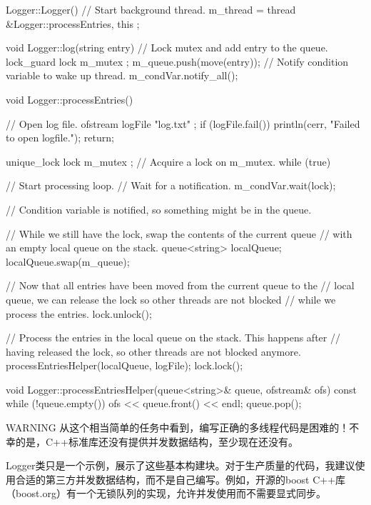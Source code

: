 \begin{cpp}
Logger::Logger()
{
    // Start background thread.
    m_thread = thread { &Logger::processEntries, this };
}

void Logger::log(string entry)
{
    // Lock mutex and add entry to the queue.
    lock_guard lock { m_mutex };
    m_queue.push(move(entry));
    // Notify condition variable to wake up thread.
    m_condVar.notify_all();
}

void Logger::processEntries()
{
    // Open log file.
    ofstream logFile { "log.txt" };
    if (logFile.fail()) {
        println(cerr, "Failed to open logfile.");
        return;
    }

    unique_lock lock { m_mutex }; // Acquire a lock on m_mutex.
    while (true) { // Start processing loop.
        // Wait for a notification.
        m_condVar.wait(lock);

        // Condition variable is notified, so something might be in the queue.

        // While we still have the lock, swap the contents of the current queue
        // with an empty local queue on the stack.
        queue<string> localQueue;
        localQueue.swap(m_queue);

        // Now that all entries have been moved from the current queue to the
        // local queue, we can release the lock so other threads are not blocked
        // while we process the entries.
        lock.unlock();

        // Process the entries in the local queue on the stack. This happens after
        // having released the lock, so other threads are not blocked anymore.
        processEntriesHelper(localQueue, logFile);
        lock.lock();
    }
}

void Logger::processEntriesHelper(queue<string>& queue, ofstream& ofs) const
{
    while (!queue.empty()) {
        ofs << queue.front() << endl;
        queue.pop();
    }
}
\end{cpp}

\begin{myWarning}{WARNING}
从这个相当简单的任务中看到，编写正确的多线程代码是困难的！不幸的是，C++标准库还没有提供并发数据结构，至少现在还没有。

Logger类只是一个示例，展示了这些基本构建块。对于生产质量的代码，我建议使用合适的第三方并发数据结构，而不是自己编写。例如，开源的boost C++库（boost.org）有一个无锁队列的实现，允许并发使用而不需要显式同步。
\end{myWarning}

